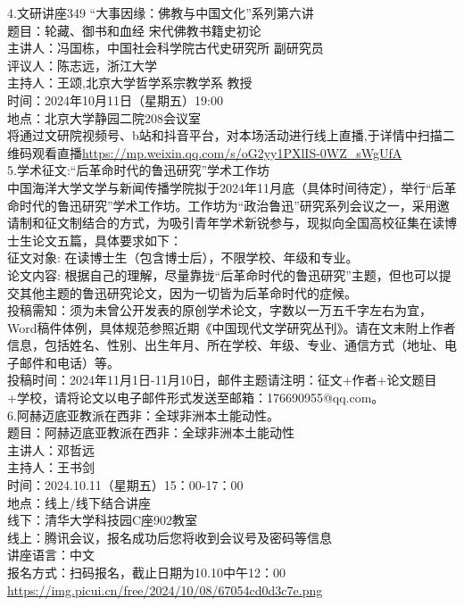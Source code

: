 \documentclass[letterpaper, 12pt]{article}
\begin{document}
\begin{multicols}{2}
4.文研讲座349 “大事因缘：佛教与中国文化”系列第六讲\\
题目：轮藏、御书和血经 宋代佛教书籍史初论\\
主讲人：冯国栋，中国社会科学院古代史研究所 副研究员\\
评议人：陈志远，浙江大学\\
主持人：王颂,北京大学哲学系宗教学系 教授\\
时间：2024年10月11日（星期五）19:00\\
地点：北京大学静园二院208会议室\\
将通过文研院视频号、b站和抖音平台，对本场活动进行线上直播,于详情中扫描二维码观看直播\url{https://mp.weixin.qq.com/s/oG2yy1PXlIS-0WZ_sWgUfA}\\

5.学术征文:“后革命时代的鲁迅研究”学术工作坊\\
中国海洋大学文学与新闻传播学院拟于2024年11月底（具体时间待定），举行“后革命时代的鲁迅研究”学术工作坊。工作坊为“政治鲁迅”研究系列会议之一，采用邀请制和征文制结合的方式，为吸引青年学术新锐参与，现拟向全国高校征集在读博士生论文五篇，具体要求如下：\\
征文对象: 在读博士生（包含博士后），不限学校、年级和专业。\\
论文内容: 根据自己的理解，尽量靠拢“后革命时代的鲁迅研究”主题，但也可以提交其他主题的鲁迅研究论文，因为一切皆为后革命时代的症候。\\
投稿需知：须为未曾公开发表的原创学术论文，字数以一万五千字左右为宜，Word稿件体例，具体规范参照近期《中国现代文学研究丛刊》。请在文末附上作者信息，包括姓名、性别、出生年月、所在学校、年级、专业、通信方式（地址、电子邮件和电话）等。\\
投稿时间：2024年11月1日-11月10日，邮件主题请注明：征文+作者+论文题目+学校，请将论文以电子邮件形式发送至邮箱：176690955@qq.com。\\

6.阿赫迈底亚教派在西非：全球非洲本土能动性。\\
题目：阿赫迈底亚教派在西非：全球非洲本土能动性\\
主讲人：邓哲远\\
主持人：王书剑\\
时间：2024.10.11（星期五）15：00-17：00\\
地点：线上/线下结合讲座\\
线下：清华大学科技园C座902教室\\
线上：腾讯会议，报名成功后您将收到会议号及密码等信息\\
讲座语言：中文\\
报名方式：扫码报名，截止日期为10.10中午12：00\\
\url{https://img.picui.cn/free/2024/10/08/67054cd0d3c7e.png}\\




\end{multicols}
\end{document}
